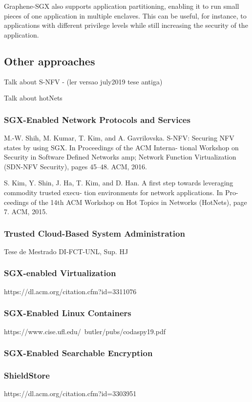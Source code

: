 Graphene-SGX also supports application partitioning, enabling it to run small pieces of one application in multiple enclaves. This can be useful, for instance, to applications with different privilege levels while still increasing the security of the application.
\subsection{Other approaches}

Talk about S-NFV - (ler versao july2019 tese antiga)

Talk about hotNets

\subsubsection{SGX-Enabled Network Protocols and Services}
M.-W. Shih, M. Kumar, T. Kim, and A. Gavrilovska. S-NFV: Securing NFV states by
using SGX. In Proceedings of the ACM Interna- tional Workshop on Security in
Software Defined Networks amp; Network Function Virtualization (SDN-NFV Security),
pages 45–48. ACM, 2016.

S. Kim, Y. Shin, J. Ha, T. Kim, and D. Han. A first step towards leveraging commodity
trusted execu- tion environments for network applications. In Pro- ceedings of the
14th ACM Workshop on Hot Topics in Networks (HotNets), page 7. ACM, 2015.
\subsubsection{Trusted Cloud-Based System Administration}
Tese de Mestrado DI-FCT-UNL, Sup. HJ
\subsubsection{SGX-enabled Virtualization}
https://dl.acm.org/citation.cfm?id=3311076
\subsubsection{SGX-Enabled Linux Containers}
https://www.cise.ufl.edu/~butler/pubs/codaspy19.pdf
\subsubsection{SGX-Enabled Searchable Encryption}
\subsubsection{ShieldStore}
https://dl.acm.org/citation.cfm?id=3303951
